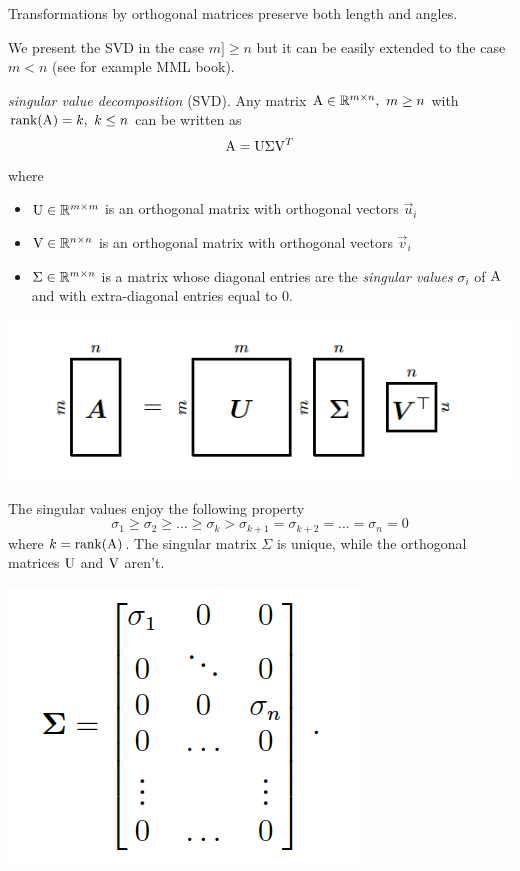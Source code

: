 Transformations by orthogonal matrices preserve both length and angles.

We present the SVD in the case $m ]\geq n$ but it can be easily extended to the case $m<n$ (see for example MML book).
\begin{proposition}
\textit{singular value decomposition} (SVD).
Any matrix $\mathrm{A} \in \mathbb{R}^{m \times n},\ m \geq  n$ with $\mathrm{rank}(\mathrm{A}) = k,\ k \leq n$ can be written as
$$ \mathrm{A} = \mathrm{U}\mathrm{\Sigma}\mathrm{V}^T $$
where
\begin{itemize}
    \item $\mathrm{U} \in \mathbb{R}^{m \times m}$ is an orthogonal matrix  with orthogonal vectors $\vec{u}_i$
    \item $\mathrm{V} \in \mathbb{R}^{n \times n}$ is an orthogonal matrix with orthogonal vectors $\vec{v}_i$
    \item $\Sigma \in \mathbb{R}^{m \times n}$ is a  matrix whose diagonal entries are the \textit{singular values} $\sigma_i$ of $\mathrm{A}$ and with extra-diagonal entries equal to 0.
\end{itemize}
\end{proposition}

\includegraphics[width=0.7 \textwidth]{sections/images/svd.png}

 The singular values enjoy the following property
    $$ \sigma_1 \geq \sigma_2 \geq \hdots \geq \sigma_k > \sigma_{k+1} = \sigma_{k+2} = \hdots = \sigma_{n} = 0 $$
    where $k = \mathrm{rank}(\mathrm{A})$. The singular matrix $\Sigma$ is unique, while the orthogonal matrices $\mathrm{U}$ and $\mathrm{V}$ aren't.

\includegraphics[width=0.5 \textwidth]{sections/images/svd1.png}

